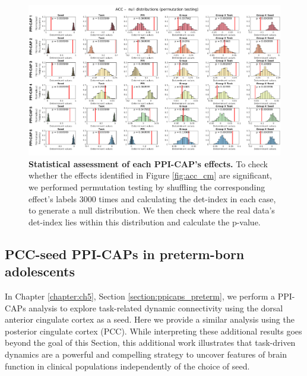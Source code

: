 \begin{figure}
\centering
\includegraphics[width=1\textwidth]{images/Appendix/Ch5_ACC_stats.png}
\caption{\textbf{Statistical assessment of each PPI-CAP's effects.} To check whether the effects identified in Figure \ref{fig:acc_cm} are significant, we performed permutation testing by shuffling the corresponding effect's labels 3000 times and calculating the det-index in each case, to generate a null distribution. We then check where the real data's det-index lies within this distribution and calculate the p-value. }
\label{fig:app_acc_stats}
\end{figure}








\clearpage
\subsection*{PCC-seed PPI-CAPs in preterm-born adolescents} \label{sm_pcc_ppicaps}
 In Chapter \ref{chapter:ch5}, Section \ref{section:ppicaps_preterm}, we perform a PPI-CAPs analysis to explore task-related dynamic connectivity using the dorsal anterior cingulate cortex as a seed. Here we provide a similar analysis using the posterior cingulate cortex (PCC). While interpreting these additional results goes beyond the goal of this Section, this additional work illustrates that task-driven dynamics are a powerful and compelling strategy to uncover features of brain function in clinical populations independently of the choice of seed. 
\vspace{1cm}




